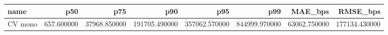 \begin{tabular}{lrrrrrrr}
\toprule
name & p50 & p75 & p90 & p95 & p99 & MAE_bps & RMSE_bps \\
\midrule
CV mono & 657.600000 & 37968.850000 & 191705.490000 & 357062.570000 & 844999.970000 & 63062.750000 & 177134.430000 \\
\bottomrule
\end{tabular}
